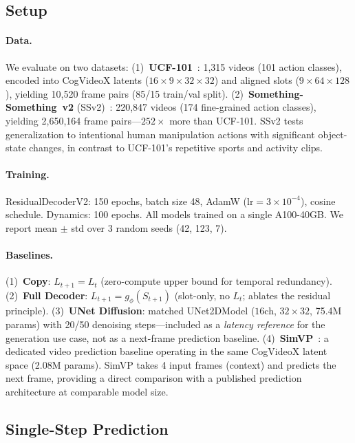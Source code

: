 \documentclass{article}
\begin{document}
\subsection{Setup}
\label{sec:setup}

\paragraph{Data.}
We evaluate on two datasets:
(1)~\textbf{UCF-101}~\cite{soomro2012ucf101}: 1{,}315 videos (101
action classes), encoded into CogVideoX latents
($16 \times 9 \times 32 \times 32$) and aligned slots
($9 \times 64 \times 128$), yielding 10{,}520 frame pairs
(85/15 train/val split).
(2)~\textbf{Something-Something~v2} (SSv2)~\cite{goyal2017something}:
220{,}847 videos (174 fine-grained action classes), yielding 2{,}650{,}164
frame pairs---$252\times$ more than UCF-101.
SSv2 tests generalization to intentional human manipulation actions
with significant object-state changes, in contrast to UCF-101's
repetitive sports and activity clips.

\paragraph{Training.}
ResidualDecoderV2: 150 epochs, batch size 48, AdamW ($\text{lr}{=}3{\times}10^{-4}$),
cosine schedule.
Dynamics: 100 epochs.
All models trained on a single A100-40GB.
We report mean $\pm$ std over 3 random seeds (42, 123, 7).

\paragraph{Baselines.}
(1)~\textbf{Copy}: $L_{t+1} = L_t$ (zero-compute upper bound for
temporal redundancy).
(2)~\textbf{Full Decoder}: $L_{t+1} = g_\phi(S_{t+1})$ (slot-only,
no $L_t$; ablates the residual principle).
(3)~\textbf{UNet Diffusion}: matched UNet2DModel
($16$ch, $32{\times}32$, 75.4M params) with 20/50 denoising
steps---included as a \emph{latency reference} for the generation
use case, not as a next-frame prediction baseline.
(4)~\textbf{SimVP}~\cite{gao2022simvp}: a dedicated video prediction
baseline operating in the same CogVideoX latent space (2.08M params).
SimVP takes 4 input frames (context) and predicts the next frame,
providing a direct comparison with a published prediction architecture
at comparable model size.

\subsection{Single-Step Prediction}
\label{sec:single_step}
\end{document}
